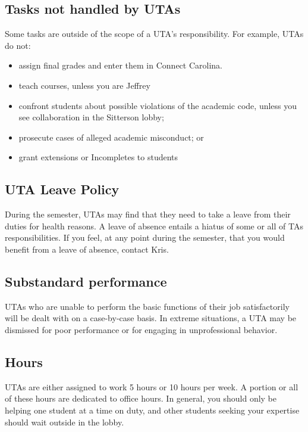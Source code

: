 \documentclass[a4paper]{article}
\begin{document}
\subsection{Tasks not handled by UTAs}
Some tasks are outside of the scope of a UTA's responsibility. For example, UTAs do not:
\begin{itemize}
\item assign final grades and enter them in Connect Carolina. 
\item teach courses, unless you are Jeffrey 
\item confront students about possible violations of the academic code, unless you see collaboration in the Sitterson lobby; 
\item prosecute cases of alleged academic misconduct; or 
\item grant extensions or Incompletes to students 
\end{itemize}
\subsection{UTA Leave Policy}
During the semester, UTAs may find that they need to take a leave from their duties for
health reasons. A leave of absence entails a hiatus of some or all of TAs responsibilities. If 
you feel, at any point during the semester, that you would benefit from a leave of absence, contact Kris. 
\subsection{Substandard performance}
UTAs who are unable to perform the basic functions of their job satisfactorily will be dealt
with on a case-by-case basis. In extreme situations, a UTA may be dismissed for poor
performance or for engaging in unprofessional behavior. 
\subsection{Hours}
UTAs are either assigned to work 5 hours or 10 hours per week. A portion or all of these hours are dedicated to office hours. In general, you should only be helping one student at a time on duty, and other students seeking your expertise should wait outside in the lobby. 
\end{document}
